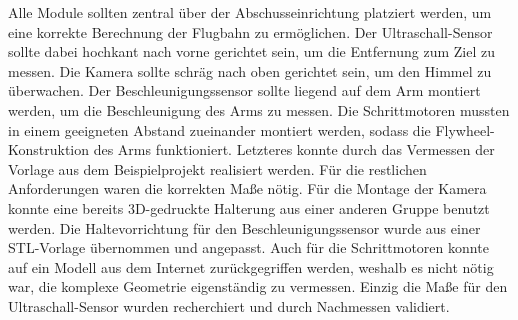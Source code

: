 Alle Module sollten zentral über der Abschusseinrichtung platziert werden, um eine korrekte Berechnung der Flugbahn zu ermöglichen. Der Ultraschall-Sensor sollte dabei hochkant nach vorne gerichtet sein, um die Entfernung zum Ziel zu messen. Die Kamera sollte schräg nach oben gerichtet sein, um den Himmel zu überwachen. Der Beschleunigungssensor sollte liegend auf dem Arm montiert werden, um die Beschleunigung des Arms zu messen. Die Schrittmotoren mussten in einem geeigneten Abstand zueinander montiert werden, sodass die Flywheel-Konstruktion des Arms funktioniert. Letzteres konnte durch das Vermessen der Vorlage aus dem Beispielprojekt \cite{cad_turret_blueprint} realisiert werden. Für die restlichen Anforderungen waren die korrekten Maße nötig. Für die Montage der Kamera konnte eine bereits 3D-gedruckte Halterung aus einer anderen Gruppe benutzt werden. Die Haltevorrichtung für den Beschleunigungssensor wurde aus einer STL-Vorlage \cite{cad_gyro_blueprint} übernommen und angepasst. Auch für die Schrittmotoren konnte auf ein Modell aus dem Internet \cite{cad_servo_v1_blueprint} zurückgegriffen werden, weshalb es nicht nötig war, die komplexe Geometrie eigenständig zu vermessen. Einzig die Maße für den Ultraschall-Sensor wurden recherchiert \cite{cad_geometry_srf02} und durch Nachmessen validiert.

